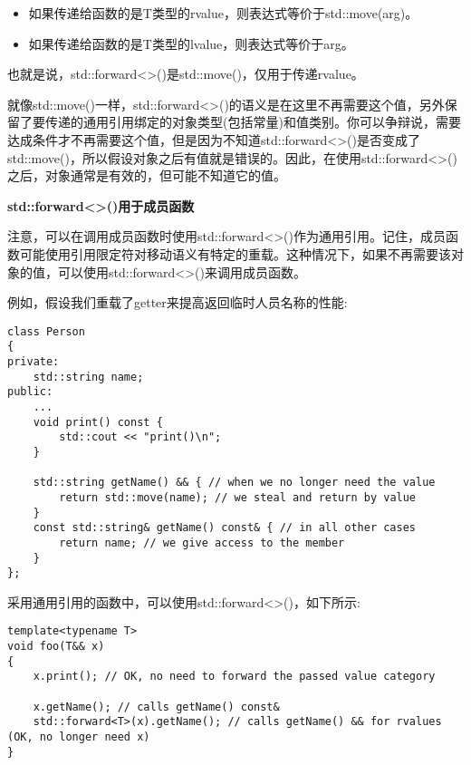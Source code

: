 \begin{itemize}
	\item 如果传递给函数的是T类型的rvalue，则表达式等价于std::move(arg)。
	\item 如果传递给函数的是T类型的lvalue，则表达式等价于arg。
\end{itemize}

也就是说，std::forward<>()是std::move()，仅用于传递rvalue。\par

就像std::move()一样，std::forward<>()的语义是在这里不再需要这个值，另外保留了要传递的通用引用绑定的对象类型(包括常量)和值类别。你可以争辩说，需要达成条件才不再需要这个值，但是因为不知道std::forward<>()是否变成了std::move()，所以假设对象之后有值就是错误的。因此，在使用std::forward<>()之后，对象通常是有效的，但可能不知道它的值。\par

\hspace*{\fill} \par %
\textbf{std::forward<>()用于成员函数}

注意，可以在调用成员函数时使用std::forward<>()作为通用引用。记住，成员函数可能使用引用限定符对移动语义有特定的重载。这种情况下，如果不再需要该对象的值，可以使用std::forward<>()来调用成员函数。\par

例如，假设我们重载了getter来提高返回临时人员名称的性能:\par

\begin{lstlisting}[caption={}]
class Person
{
private:
	std::string name;
public:
	...
	void print() const {
		std::cout << "print()\n";
	}

	std::string getName() && { // when we no longer need the value
		return std::move(name); // we steal and return by value
	}
	const std::string& getName() const& { // in all other cases
		return name; // we give access to the member
	}
};
\end{lstlisting}

采用通用引用的函数中，可以使用std::forward<>()，如下所示:\par

\begin{lstlisting}[caption={}]
template<typename T>
void foo(T&& x)
{
	x.print(); // OK, no need to forward the passed value category
	
	x.getName(); // calls getName() const&
	std::forward<T>(x).getName(); // calls getName() && for rvalues (OK, no longer need x)
}
\end{lstlisting}

